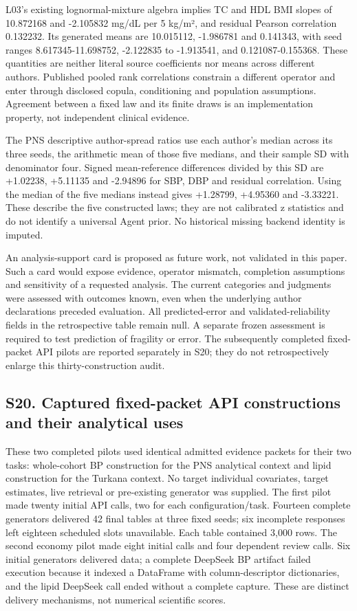 \documentclass[11pt,letterpaper]{article}
\begin{document}
L03's existing lognormal-mixture algebra implies TC and HDL BMI slopes of 10.872168 and -2.105832 mg/\allowbreak{}dL per 5 kg/\allowbreak{}m², and residual Pearson correlation 0.132232. Its generated means are 10.015112, -1.986781 and 0.141343, with seed ranges 8.617345-11.698752, -2.122835 to -1.913541, and 0.121087-0.155368. These quantities are neither literal source coefficients nor means across different authors. Published pooled rank correlations constrain a different operator and enter through disclosed copula, conditioning and population assumptions. Agreement between a fixed law and its finite draws is an implementation property, not independent clinical evidence.


The PNS descriptive author-spread ratios use each author's median across its three seeds, the arithmetic mean of those five medians, and their sample SD with denominator four. Signed mean-reference differences divided by this SD are +1.02238, +5.11135 and -2.94896 for SBP, DBP and residual correlation. Using the median of the five medians instead gives +1.28799, +4.95360 and -3.33221. These describe the five constructed laws; they are not calibrated z statistics and do not identify a universal Agent prior. No historical missing backend identity is imputed.


An analysis-support card is proposed as future work, not validated in this paper. Such a card would expose evidence, operator mismatch, completion assumptions and sensitivity of a requested analysis. The current categories and judgments were assessed with outcomes known, even when the underlying author declarations preceded evaluation. All predicted-error and validated-reliability fields in the retrospective table remain null. A separate frozen assessment is required to test prediction of fragility or error. The subsequently completed fixed-packet API pilots are reported separately in S20; they do not retrospectively enlarge this thirty-construction audit.


\clearpage

\subsection*{S20. Captured fixed-packet API constructions and their analytical uses}

These two completed pilots used identical admitted evidence packets for their two tasks: whole-cohort BP construction for the PNS analytical context and lipid construction for the Turkana context. No target individual covariates, target estimates, live retrieval or pre-existing generator was supplied. The first pilot made twenty initial API calls, two for each configuration/\allowbreak{}task. Fourteen complete generators delivered 42 final tables at three fixed seeds; six incomplete responses left eighteen scheduled slots unavailable. Each table contained 3,000 rows. The second economy pilot made eight initial calls and four dependent review calls. Six initial generators delivered data; a complete DeepSeek BP artifact failed execution because it indexed a DataFrame with column-descriptor dictionaries, and the lipid DeepSeek call ended without a complete capture. These are distinct delivery mechanisms, not numerical scientific scores.
\end{document}
